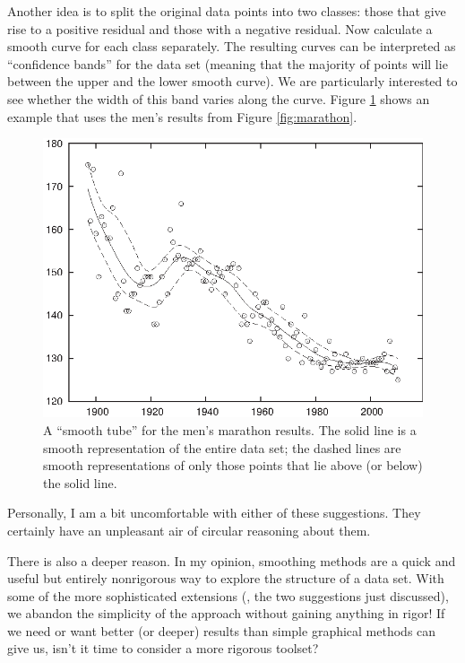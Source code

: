 Another idea is to split the original data points into two classes:
those that give rise to a positive residual and those with a negative
residual. Now calculate a smooth curve for each class separately. The
resulting curves can be interpreted as ``confidence bands'' for the
data set (meaning that the majority of points will lie between the
upper and the lower smooth curve). We are particularly interested to
see whether the width of this band varies along the curve. Figure
\ref{fig:smoothtube} shows an example that uses the men's results from
Figure \ref{fig:marathon}.

\begin{figure}
  \centerline{  \includegraphics{img/smoothtube}}
  \caption{A ``smooth tube'' for the men's marathon results. The solid
    line is a smooth representation of the entire data set; the dashed
    lines are smooth representations of only those points that lie above
    (or below) the solid line.}
  \label{fig:smoothtube}
\end{figure}

Personally, I am a bit uncomfortable with either of these suggestions.
They certainly have an unpleasant air of circular reasoning about them.

There is also a deeper reason.  In my opinion, smoothing methods are a
quick and useful but entirely nonrigorous way to explore the structure
of a data set. With some of the more sophisticated extensions (\eg,
the two suggestions just discussed), we abandon the simplicity of the
approach without gaining anything in rigor! If we need or want better
(or deeper) results than simple graphical methods can give us, isn't
it time to consider a more rigorous toolset?

